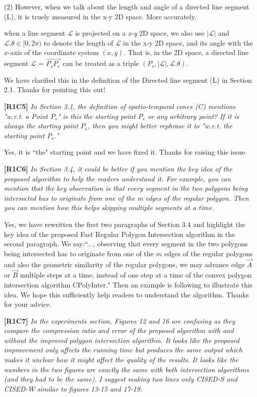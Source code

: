 \documentclass{letter}
\newcommand{\vv}{\overrightarrow}
\begin{document}
(2) However, when we talk about the length and angle of a directed line segment (L), it is truely measured in the x-y 2D space. More accurately, {when a line segment $\mathcal{L}$ is projected on a \emph{x-y} 2D space, we also use $|\mathcal{L}|$ and $\mathcal{L}.\theta\in [0, 2\pi)$ to denote the length of $\mathcal{L}$ in the x-y 2D space, and its angle with the $x$-axis of the coordinate system $(x, y)$.  That is, in the 2D space, a directed line segment $\mathcal{L}$ = $\vv{P_{s}P_{e}}$ can be treated as a triple $(P_s, |\mathcal{L}|, \mathcal{L}.\theta)$.

We have clarified this in the definition of the Directed line segment (L) in Section 2.1. Thanks for pointing this out!


\textbf{[R1C5]} \emph{In Section 3.1, the definition of spatio-temporal cones (C) mentions "w.r.t. a Point $P_s$" is this the starting point $P_s$ or any arbitrary point? If it is always the starting point $P_s$, then you might better rephrase it to "w.r.t. the starting point $P_s$."}

Yes, it is ``the" starting point and we have fixed it. Thanks for raising this issue.

\textbf{[R1C6]} \emph{In Section 3.4, it could be better if you mention the key idea of the proposed algorithm to help the readers understand it. For example, you can mention that the key observation is that every segment in the two polygons being intersected has to originate from one of the m edges of the regular polygon. Then you can mention how this helps skipping multiple segments at a time.}

Yes, we have rewritten the first two paragraphs of Section 3.4 and highlight the key idea of the proposed Fast Regular Polygon Intersection algorithm in the second paragraph.
{We say:``..., observing that every segment in the two polygons being intersected has to originate from one of the $m$ edges of the regular polygons and also the geometric similarity of the regular polygons,
we may advance edge $\vv{A}$ or $\vv{B}$ multiple steps at a time, instead of one step at a time of the convex polygon intersection algorithm CPolyInter."} Then an example is following to illustrate this idea.
We hope this sufficiently help readers to understand the algorithm. Thanks for your advice.



\textbf{[R1C7]} \emph{In the experiments section, Figures 12 and 16 are confusing as they compare the compression ratio and error of the proposed algorithm with and without the improved polygon intersection algorithm. It looks like the proposed improvement only affects the running time but produces the same output which makes it unclear how it might affect the quality of the results. It looks like the numbers in the two figures are exactly the same with both intersection algorithms (and they had to be the same). I suggest making two lines only CISED-S and CISED-W similar to figures 13-15 and 17-19.}

}
\end{document}
